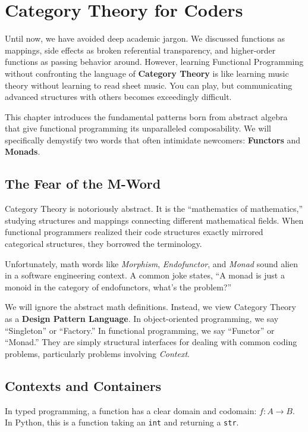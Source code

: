 \chapter{Category Theory for Coders}
\label{ch:category_theory}

Until now, we have avoided deep academic jargon. We discussed functions as mappings, side effects as broken referential transparency, and higher-order functions as passing behavior around. However, learning Functional Programming without confronting the language of \textbf{Category Theory} is like learning music theory without learning to read sheet music. You can play, but communicating advanced structures with others becomes exceedingly difficult.

This chapter introduces the fundamental patterns born from abstract algebra that give functional programming its unparalleled composability. We will specifically demystify two words that often intimidate newcomers: \textbf{Functors} and \textbf{Monads}.

\section{The Fear of the M-Word}

Category Theory is notoriously abstract. It is the ``mathematics of mathematics,'' studying structures and mappings connecting different mathematical fields. When functional programmers realized their code structures exactly mirrored categorical structures, they borrowed the terminology.

Unfortunately, math words like \textit{Morphism}, \textit{Endofunctor}, and \textit{Monad} sound alien in a software engineering context. A common joke states, ``A monad is just a monoid in the category of endofunctors, what's the problem?'' 

We will ignore the abstract math definitions. Instead, we view Category Theory as a \textbf{Design Pattern Language}. In object-oriented programming, we say ``Singleton'' or ``Factory.'' In functional programming, we say ``Functor'' or ``Monad.'' They are simply structural interfaces for dealing with common coding problems, particularly problems involving \textit{Context}.

\section{Contexts and Containers}

In typed programming, a function has a clear domain and codomain: $f: A \rightarrow B$. In Python, this is a function taking an \texttt{int} and returning a \texttt{str}.

